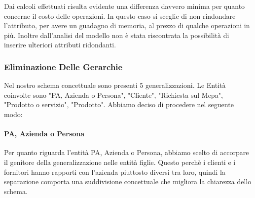 \begin{table}[H]
\centering
\caption{Costo Operazioni senza Ridondanza}
\label{my-label}
\end{table}
Dai calcoli effettuati risulta evidente una differenza davvero minima per quanto concerne il costo delle operazioni. In questo caso si sceglie di non rindondare l'attributo, per avere un guadagno di memoria, al prezzo di qualche operazioni in più.
\newline
Inoltre dall'analisi del modello non è stata riscontrata la possibilità di inserire ulteriori attributi ridondanti.


\newpage
\subsubsection{Eliminazione Delle Gerarchie}

Nel nostro schema concettuale sono presenti 5 generalizzazioni. Le Entità coinvolte sono "PA, Azienda o Persona", "Cliente", "Richiesta sul Mepa", "Prodotto o servizio", "Prodotto".
\newline
Abbiamo deciso di procedere nel seguente modo:

\paragraph{PA, Azienda o Persona}
Per quanto riguarda l'entità PA, Azienda o Persona, abbiamo scelto di accorpare il genitore della generalizzazione nelle entità figlie. Questo perchè i clienti e i fornitori hanno rapporti con l'azienda piuttosto diversi tra loro, quindi la separazione comporta una suddivisione concettuale che migliora la chiarezza dello schema.

